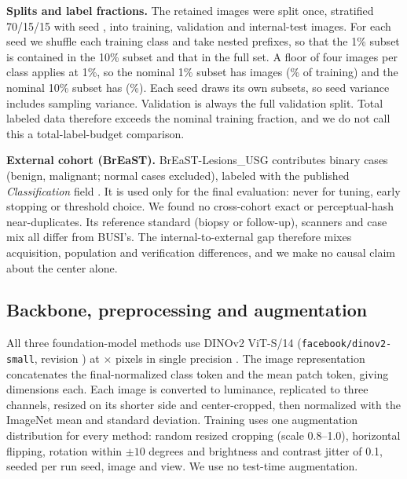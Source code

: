\documentclass[conference,a4paper]{IEEEtran}
\begin{document}
\textbf{Splits and label fractions.} The retained images were split once,
stratified 70/15/15 with seed \valProtocolSplitSeed, into \valDataBusiTrain
training, \valDataBusiVal validation and \valDataBusiTest internal-test images.
For each seed we shuffle each training class and take nested prefixes, so that
the 1\% subset is contained in the 10\% subset and that in the full set. A floor
of four images per class applies at 1\%, so the nominal 1\% subset has
\valDataSubsetOneN images (\valDataSubsetOneActualPct\% of training) and the
nominal 10\% subset has \valDataSubsetTenN (\valDataSubsetTenActualPct\%). Each
seed draws its own subsets, so seed variance includes sampling variance.
Validation is always the full validation split. Total labeled data therefore
exceeds the nominal training fraction, and we do not call this a
total-label-budget comparison.

\textbf{External cohort (BrEaST).} BrEaST-Lesions\_USG contributes
\valDataBreastTotal binary cases (\valDataBreastBenign benign,
\valDataBreastMalignant malignant; \valDataBreastNormalExcluded normal cases
excluded), labeled with the published \emph{Classification} field
\cite{pawlowska2024breast,pawlowska2024tciadata}. It is used only for the final
evaluation: never for tuning, early stopping or threshold choice. We found no
cross-cohort exact or perceptual-hash near-duplicates. Its reference standard
(biopsy or follow-up), scanners and case mix all differ from BUSI's. The
internal-to-external gap therefore mixes acquisition, population and
verification differences, and we make no causal claim about the center alone.

\subsection{Backbone, preprocessing and augmentation}

All three foundation-model methods use DINOv2 ViT-S/14
(\texttt{facebook/dinov2-small}, revision \valBackboneRevisionShort) at
\valProtocolImageSize $\times$ \valProtocolImageSize pixels in single precision
\cite{oquab2024dinov2}. The image representation concatenates the
final-normalized class token and the mean patch token, giving
\valBackboneHiddenSize dimensions each. Each image is converted to luminance,
replicated to three channels, resized on its shorter side and center-cropped,
then normalized with the ImageNet mean and standard deviation. Training uses one
augmentation distribution for every method: random resized cropping (scale
0.8--1.0), horizontal flipping, rotation within $\pm 10$ degrees and
brightness and contrast jitter of 0.1, seeded per run seed, image and view. We
use no test-time augmentation.
\end{document}
